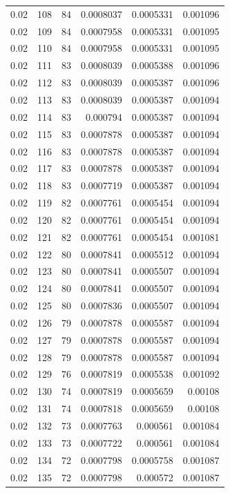 \begin{tabular}{rrrrrr}
0.02 & 108 & 84 & 0.0008037 & 0.0005331 & 0.001096 \\
0.02 & 109 & 84 & 0.0007958 & 0.0005331 & 0.001095 \\
0.02 & 110 & 84 & 0.0007958 & 0.0005331 & 0.001095 \\
0.02 & 111 & 83 & 0.0008039 & 0.0005388 & 0.001096 \\
0.02 & 112 & 83 & 0.0008039 & 0.0005387 & 0.001096 \\
0.02 & 113 & 83 & 0.0008039 & 0.0005387 & 0.001094 \\
0.02 & 114 & 83 & 0.000794 & 0.0005387 & 0.001094 \\
0.02 & 115 & 83 & 0.0007878 & 0.0005387 & 0.001094 \\
0.02 & 116 & 83 & 0.0007878 & 0.0005387 & 0.001094 \\
0.02 & 117 & 83 & 0.0007878 & 0.0005387 & 0.001094 \\
0.02 & 118 & 83 & 0.0007719 & 0.0005387 & 0.001094 \\
0.02 & 119 & 82 & 0.0007761 & 0.0005454 & 0.001094 \\
0.02 & 120 & 82 & 0.0007761 & 0.0005454 & 0.001094 \\
0.02 & 121 & 82 & 0.0007761 & 0.0005454 & 0.001081 \\
0.02 & 122 & 80 & 0.0007841 & 0.0005512 & 0.001094 \\
0.02 & 123 & 80 & 0.0007841 & 0.0005507 & 0.001094 \\
0.02 & 124 & 80 & 0.0007841 & 0.0005507 & 0.001094 \\
0.02 & 125 & 80 & 0.0007836 & 0.0005507 & 0.001094 \\
0.02 & 126 & 79 & 0.0007878 & 0.0005587 & 0.001094 \\
0.02 & 127 & 79 & 0.0007878 & 0.0005587 & 0.001094 \\
0.02 & 128 & 79 & 0.0007878 & 0.0005587 & 0.001094 \\
0.02 & 129 & 76 & 0.0007819 & 0.0005538 & 0.001092 \\
0.02 & 130 & 74 & 0.0007819 & 0.0005659 & 0.00108 \\
0.02 & 131 & 74 & 0.0007818 & 0.0005659 & 0.00108 \\
0.02 & 132 & 73 & 0.0007763 & 0.000561 & 0.001084 \\
0.02 & 133 & 73 & 0.0007722 & 0.000561 & 0.001084 \\
0.02 & 134 & 72 & 0.0007798 & 0.0005758 & 0.001087 \\
0.02 & 135 & 72 & 0.0007798 & 0.000572 & 0.001087 \\

\end{tabular}
